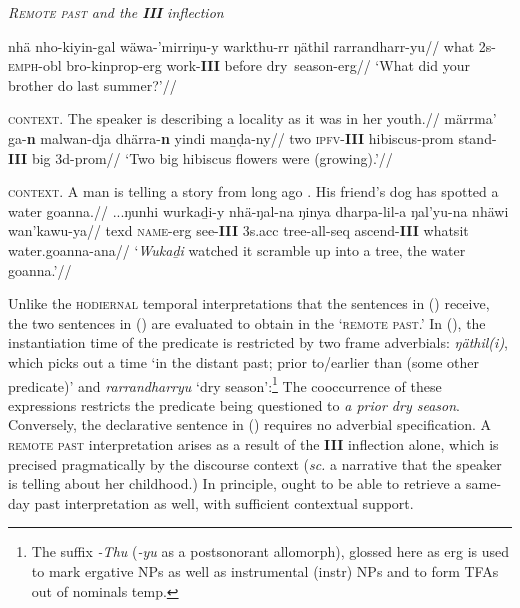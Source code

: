 \pex\textit{\textsc{Remote past} and the \textbf{III} inflection}

\a{}\begingl\gla nhä nho-kiyin-gal wäwa-'mirriŋu-y warkthu-rr ŋäthil rarrandharr-yu//
\glb what 2s-\textsc{emph}-\gls{obl} bro-\gls{kinprop}-\gls{erg} work-\textbf{III} before dry~season-\gls{erg}//
\glft`What did your brother do last summer?'//\endgl

\a{}\begingl\glpreamble\textsc{context.} The speaker is describing a locality as it was in her youth.//
\gla märrma' ga-\textbf{n} malwan-dja dhärra-\textbf{n} yindi maṉḍa-ny//
\glb two \textsc{ipfv}-\textbf{III} hibiscus-\gls{prom} stand-\textbf{III} big 3d-\gls{prom}//
\glft`Two big hibiscus flowers were (growing).'//\endgl

\a{}\begingl\glpreamble\textsc{context.} A man is telling a story from long ago . His friend's dog has spotted a water goanna.//
\gla ...ŋunhi wurkaḏi-y nhä-ŋal-{na} ŋinya dharpa-lil-a ŋal'yu-na nhäwi wan'kawu-ya//
\glb \gls{texd} \textsc{name}-\gls{erg} see-\textbf{III} 3s.\gls{acc} tree-\gls{all}-\gls{seq} ascend-\textbf{III} whatsit water.goanna-\gls{ana}//
\glft`\textit{Wukaḏi} watched it scramble up into a tree, the water goanna.'//\endgl{}



\xe


Unlike the \textsc{hodiernal} temporal interpretations that the sentences in (\blastx) receive, the two sentences in (\lastx) are evaluated to obtain in the `\textsc{remote past}.' In (), the instantiation time of the predicate is restricted by two frame adverbials: \textit{ŋäthil(i)}, which picks out a time `in the distant past; prior to/earlier than (some other predicate)' \citep[158]{Wilkinson1991} and \textit{rarrandharryu} `dry season':\footnote{The suffix \textit{-Thu} (\textit{-yu} as a postsonorant allomorph), glossed here as \gls{erg} is used to mark ergative NPs as well as instrumental (\gls{instr}) NPs and to form TFAs out of nominals \gls{temp}.} The cooccurrence of these expressions restricts the predicate being questioned to \textit{a prior dry season}. Conversely, the declarative sentence in () requires no adverbial specification. A \textsc{remote past} interpretation arises as a result of the \textbf{III} inflection alone, which is precised pragmatically by the discourse context (\textit{sc.} a narrative that the speaker is telling about her childhood.) In principle,  ought to be able to retrieve a same-day past interpretation as well, with sufficient contextual support.

